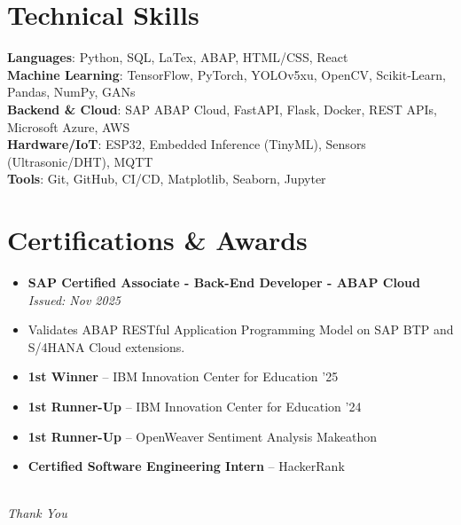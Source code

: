 \documentclass[a4paper,10pt]{article}
\newcommand{\resumeItem}[1]{
  \item\small{
    {#1 \vspace{-2pt}}
  }
}
\newcommand{\resumeSubHeadingListStart}{\begin{itemize}[leftmargin=0.15in, label={}]}
\newcommand{\resumeSubHeadingListEnd}{\end{itemize}}
\begin{document}
\section{Technical Skills}
 \begin{itemize}[leftmargin=0.15in, label={}]
    \small{\item{
     \textbf{Languages}{: Python, SQL, LaTex, ABAP, HTML/CSS, React} \\
     \textbf{Machine Learning}{: TensorFlow, PyTorch, YOLOv5xu, OpenCV, Scikit-Learn, Pandas, NumPy, GANs} \\
     \textbf{Backend \& Cloud}{: SAP ABAP Cloud, FastAPI, Flask, Docker, REST APIs, Microsoft Azure, AWS} \\
     \textbf{Hardware/IoT}{: ESP32, Embedded Inference (TinyML), Sensors (Ultrasonic/DHT), MQTT} \\
     \textbf{Tools}{: Git, GitHub, CI/CD, Matplotlib, Seaborn, Jupyter}
    }}
 \end{itemize}

\section{Certifications \& Awards}
  \resumeSubHeadingListStart
    \resumeItem{\textbf{SAP Certified Associate - Back-End Developer - ABAP Cloud} \hfill \textit{Issued: Nov 2025}}
    \vspace{-2pt}
    \resumeItem{\small Validates ABAP RESTful Application Programming Model on SAP BTP and S/4HANA Cloud extensions.}
    \vspace{2pt}
    \resumeItem{\textbf{1st Winner} -- IBM Innovation Center for Education '25}
    \resumeItem{\textbf{1st Runner-Up} -- IBM Innovation Center for Education '24}
    \resumeItem{\textbf{1st Runner-Up} -- OpenWeaver Sentiment Analysis Makeathon}
    \resumeItem{\textbf{Certified Software Engineering Intern} -- HackerRank}
  \resumeSubHeadingListEnd

\vfill 

\begin{center}
     \\
    \vspace{5pt}
    \tiny \textit{Thank You}
\end{center}
\end{document}

